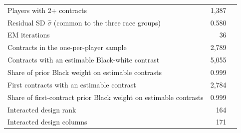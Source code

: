 \begin{table}[H]
{\begin{tabular}[t]{lrr}
\hspace{1em}Players with 2+ contracts & 1,387 & \\
\hspace{1em}Residual SD $\hat\sigma$ (common to the three race groups) & 0.580 & \\
\hspace{1em}EM iterations & 36 & \\
\hspace{1em}Contracts in the one-per-player sample & 2,789 & \\
\hspace{1em}Contracts with an estimable Black-white contrast & 5,055 & \\
\hspace{1em}Share of prior Black weight on estimable contrasts & 0.999 & \\
\hspace{1em}First contracts with an estimable contrast & 2,784 & \\
\hspace{1em}Share of first-contract prior Black weight on estimable contrasts & 0.999 & \\
\hspace{1em}Interacted design rank & 164 & \\
\hspace{1em}Interacted design columns & 171 & \\
\bottomrule
\end{tabular}}
\end{table}

